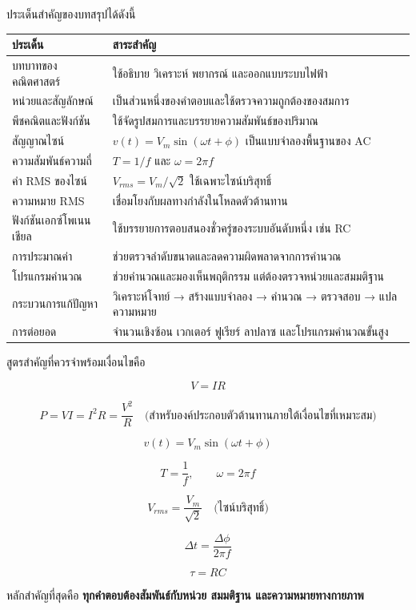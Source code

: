 ประเด็นสำคัญของบทสรุปได้ดังนี้

\begin{table}[htbp]
    \centering
    \begin{tabular}{l l}
        \hline
        \textbf{ประเด็น} & \textbf{สาระสำคัญ} \\
        \hline
        บทบาทของคณิตศาสตร์ & ใช้อธิบาย วิเคราะห์ พยากรณ์ และออกแบบระบบไฟฟ้า \\
        หน่วยและสัญลักษณ์ & เป็นส่วนหนึ่งของคำตอบและใช้ตรวจความถูกต้องของสมการ \\
        พีชคณิตและฟังก์ชัน & ใช้จัดรูปสมการและบรรยายความสัมพันธ์ของปริมาณ \\
        สัญญาณไซน์ & $v(t)=V_m\sin(\omega t+\phi)$ เป็นแบบจำลองพื้นฐานของ AC \\
        ความสัมพันธ์ความถี่ & $T=1/f$ และ $\omega=2\pi f$ \\
        ค่า RMS ของไซน์ & $V_{rms}=V_m/\sqrt{2}$ ใช้เฉพาะไซน์บริสุทธิ์ \\
        ความหมาย RMS & เชื่อมโยงกับผลทางกำลังในโหลดตัวต้านทาน \\
        ฟังก์ชันเอกซ์โพเนนเชียล & ใช้บรรยายการตอบสนองชั่วครู่ของระบบอันดับหนึ่ง เช่น RC \\
        การประมาณค่า & ช่วยตรวจลำดับขนาดและลดความผิดพลาดจากการคำนวณ \\
        โปรแกรมคำนวณ & ช่วยคำนวณและมองเห็นพฤติกรรม แต่ต้องตรวจหน่วยและสมมติฐาน \\
        กระบวนการแก้ปัญหา & วิเคราะห์โจทย์ → สร้างแบบจำลอง → คำนวณ → ตรวจสอบ → แปลความหมาย \\
        การต่อยอด & จำนวนเชิงซ้อน เวกเตอร์ ฟูเรียร์ ลาปลาซ และโปรแกรมคำนวณขั้นสูง \\
        \hline
    \end{tabular}
\end{table}

สูตรสำคัญที่ควรจำพร้อมเงื่อนไขคือ

\[
V=IR
\]

\[
P=VI=I^2R=\frac{V^2}{R}\quad\text{(สำหรับองค์ประกอบตัวต้านทานภายใต้เงื่อนไขที่เหมาะสม)}
\]

\[
v(t)=V_m\sin(\omega t+\phi)
\]

\[
T=\frac{1}{f},\qquad \omega=2\pi f
\]

\[
V_{rms}=\frac{V_m}{\sqrt{2}}\quad\text{(ไซน์บริสุทธิ์)}
\]

\[
\Delta t=\frac{\Delta\phi}{2\pi f}
\]

\[
\tau=RC
\]

หลักสำคัญที่สุดคือ \textbf{ทุกคำตอบต้องสัมพันธ์กับหน่วย สมมติฐาน และความหมายทางกายภาพ}


